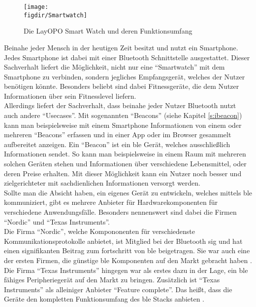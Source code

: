 \begin{figure}[h]
	\centering
	\texttt{[image: \\figdir/Smartwatch]}
	\caption{Die LayOPO Smart Watch und deren Funktionsumfang \cite{WTC:WWW}}
	\label{FIG:smartwatch}
\end{figure}

\noindent Beinahe jeder Mensch in der heutigen Zeit besitzt und nutzt ein Smartphone. Jedes Smartphone ist dabei mit einer Bluetooth Schnittstelle ausgestattet. Dieser Sachverhalt liefert die Möglichkeit, nicht nur eine "`Smartwatch"' mit dem Smartphone zu verbinden, sondern jegliches Empfangsgerät, welches der Nutzer benötigen könnte. Besonders beliebt sind dabei Fitnessgeräte, die dem Nutzer Informationen über sein Fitnesslevel liefern.\\

\noindent Allerdings liefert der Sachverhalt, dass beinahe jeder Nutzer Bluetooth nutzt auch andere "`Usecases"'. Mit sogenannten "`Beacons"' (siehe Kapitel \ref{s:ibeacon}) kann man beispielsweise mit einem Smartphone Informationen von einem oder mehreren "`Beacons"' erfassen und in einer App oder im Browser gesammelt aufbereitet anzeigen. Ein "`Beacon"' ist ein \ac{ble} Gerät, welches ausschließlich Informationen sendet. So kann man beispielsweise in einem Raum mit mehreren solchen Geräten stehen und Informationen über verschiedene Lebensmittel, oder deren Preise erhalten. Mit dieser Möglichkeit kann ein Nutzer noch besser und zielgerichteter mit sachdienlichen Informationen versorgt werden.\\

\noindent Sollte man die Absicht haben, ein eigenes Gerät zu entwickeln, welches mittels \ac{ble} kommuniziert, gibt es mehrere Anbieter für Hardwarekomponenten für verschiedene Anwendungsfälle. Besonders nennenswert sind dabei die Firmen "`Nordic"' und "`Texas Instruments"'.\\

\noindent Die Firma "`Nordic"', welche Kompononenten für verschiedenste Kommunikationsprotokolle anbietet, ist Mitglied bei der Bluetooth \ac{sig} und hat einen signifikanten Beitrag zum fortschritt von \ac{ble} beigetragen. Sie war auch eine der ersten Firmen, die günstige \ac{ble} Komponenten auf den Markt gebracht haben \cite[Seite 75]{Townsend14:GSB}.\\

\noindent Die Firma "`Texas Instruments"' hingegen war als erstes dazu in der Lage, ein \ac{ble} fähiges Peripheriegerät auf den Markt zu bringen. Zusätzlich ist "`Texas Instruments"' als alleiniger Anbieter "`Feature complete"'. Das heißt, dass die Geräte den kompletten Funktionsumfang des \ac{ble} Stacks anbieten \cite[Seite 79]{Townsend14:GSB}.\\ 

